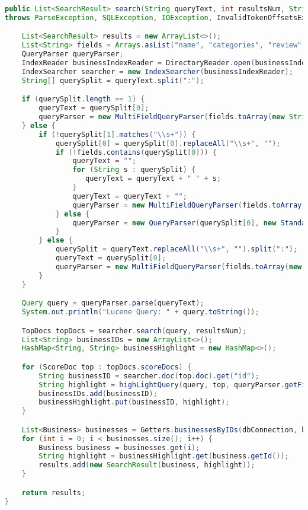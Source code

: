 \begin{lstlisting}[language=Java]
public List<SearchResult> search(String queryText, int resultsNum, String orderBy)
throws ParseException, SQLException, IOException, InvalidTokenOffsetsException {

    List<SearchResult> results = new ArrayList<>();
    List<String> fields = Arrays.asList("name", "categories", "review", "tip");
    QueryParser queryParser;
    IndexReader businessIndexReader = DirectoryReader.open(businessIndex);
    IndexSearcher searcher = new IndexSearcher(businessIndexReader);
    String[] querySplit = queryText.split(":");

    if (querySplit.length == 1) {
        queryText = querySplit[0];
        queryParser = new MultiFieldQueryParser(fields.toArray(new String[fields.size()]), analyzer);
    } else {
        if (!querySplit[1].matches("\\s+")) {
            querySplit[0] = querySplit[0].replaceAll("\\s+", "");
            if (!fields.contains(querySplit[0])) {
                queryText = "";
                for (String s : querySplit) {
                   queryText = queryText + " " + s;
                }
                queryText = queryText + "";
                queryParser = new MultiFieldQueryParser(fields.toArray(new String[fields.size()]), analyzer);
            } else {
                queryParser = new QueryParser(querySplit[0], new StandardAnalyzer());
            }
        } else {
            querySplit = queryText.replaceAll("\\s+", "").split(":");
            queryText = querySplit[0];
            queryParser = new MultiFieldQueryParser(fields.toArray(new String[fields.size()]), analyzer);
        }
    }

    Query query = queryParser.parse(queryText);
    System.out.println("Lucene Query: " + query.toString());

    TopDocs topDocs = searcher.search(query, resultsNum);
    List<String> businessIDs = new ArrayList<>();
    HashMap<String, String> businessHighlight = new HashMap<>();

    for (ScoreDoc top : topDocs.scoreDocs) {
        String businessID = searcher.doc(top.doc).get("id");
        String highlight = highLightQuery(query, top, queryParser.getField(), businessIndexReader, searcher);
        businessIDs.add(businessID);
        businessHighlight.put(businessID, highlight);
    }

    List<Business> businesses = Getters.businessesByIDs(dbConnection, businessIDs, orderBy);
    for (int i = 0; i < businesses.size(); i++) {
        Business business = businesses.get(i);
        String highlight = businessHighlight.get(business.getId());
        results.add(new SearchResult(business, highlight));
    }

    return results;
}

\end{lstlisting}


